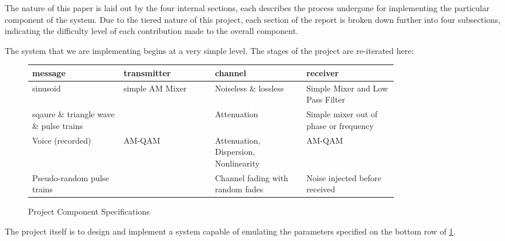 The nature of this paper is laid out by the four internal sections, each describes the process undergone for implementing the particular component of the system.
Due to the tiered nature of this project, each section of the report is broken down further into four subsections, indicating the difficulty level of each contribution made to the overall component.

The system that we are implementing begins at a very simple level. The stages of the project are re-iterated here: 

\begin{figure}[h!]
\caption{Project Component Specifications\label{tab:projspec}}
\begin{center}
\begin{tabular}{|p{0.2\linewidth}|p{0.2\linewidth}|p{0.2\linewidth}|p{0.2\linewidth}|}
\hline 
\textbf{message}&\textbf{transmitter}&\textbf{channel}&\textbf{receiver}\\ 
\hline 
sinusoid&simple AM Mixer& Noiseless \& lossless &Simple Mixer and Low Pass Filter\\ 
\hline 
sqaure \& triangle wave \& pulse trains &  & Attenuation & Simple mixer out of phase or frequency\\ 
\hline 
Voice (recorded)& AM-QAM & Attenuation, Dispersion, Nonlinearity& AM-QAM\\ 
\hline 
Pseudo-random pulse trains& & Channel fading with random fades & Noise injected before received\\
\hline 
\end{tabular}
\end{center}
\end{figure} 

The project itself is to design and implement a system capable of emulating the parameters specified on the bottom row of \ref{tab:projspec}. 

